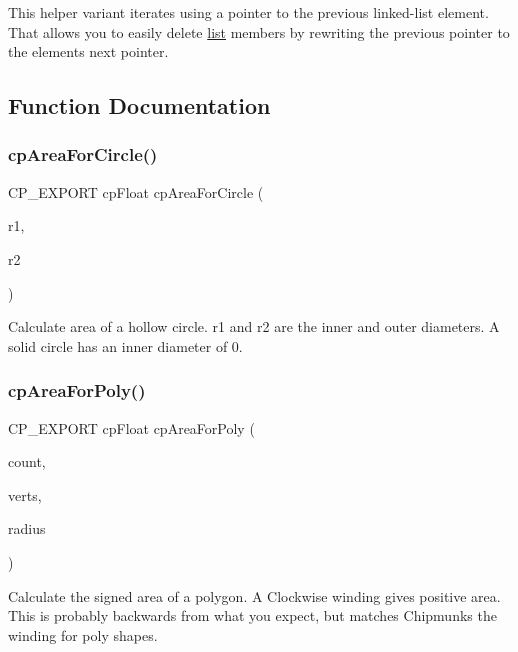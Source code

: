 This helper variant iterates using a pointer to the previous linked-\/list element. That allows you to easily delete \hyperlink{protocollist-p}{list} members by rewriting the previous pointer to the element\textquotesingle{}s next pointer. 

\subsection{Function Documentation}
\mbox{\label{group__misc_ga55a50f3dfa695db703759e550db16bce}} 
\subsubsection{\texorpdfstring{cp\+Area\+For\+Circle()}{cpAreaForCircle()}}
{\footnotesize\ttfamily C\+P\+\_\+\+E\+X\+P\+O\+RT cp\+Float cp\+Area\+For\+Circle (\begin{DoxyParamCaption}\item[{cp\+Float}]{r1,  }\item[{cp\+Float}]{r2 }\end{DoxyParamCaption})}

Calculate area of a hollow circle. {\ttfamily r1} and {\ttfamily r2} are the inner and outer diameters. A solid circle has an inner diameter of 0. \mbox{\label{group__misc_ga2bc17e58f105411e2d66c09f8047d822}} 
\subsubsection{\texorpdfstring{cp\+Area\+For\+Poly()}{cpAreaForPoly()}}
{\footnotesize\ttfamily C\+P\+\_\+\+E\+X\+P\+O\+RT cp\+Float cp\+Area\+For\+Poly (\begin{DoxyParamCaption}\item[{const int}]{count,  }\item[{const \hyperlink{structcpVect}{cp\+Vect} $\ast$}]{verts,  }\item[{cp\+Float}]{radius }\end{DoxyParamCaption})}

Calculate the signed area of a polygon. A Clockwise winding gives positive area. This is probably backwards from what you expect, but matches Chipmunk\textquotesingle{}s the winding for poly shapes. \mbox{\label{group__misc_ga94ed1fc4d2c987c3e4df3cb16b12a156}} 
